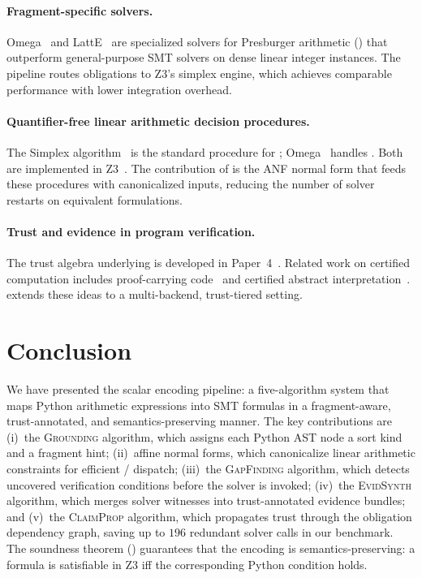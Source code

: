 \documentclass[11pt]{article}
\newcommand{\GroundAlg}{\textsc{Grounding}}  %
\newcommand{\GapAlg}{\textsc{GapFinding}}    %
\newcommand{\EvidAlg}{\textsc{EvidSynth}}    %
\newcommand{\PropAlg}{\textsc{ClaimProp}}    %
\begin{document}
\paragraph{Fragment-specific solvers.}
Omega~\cite{pugh91} and LattE~\cite{latte} are specialized
solvers for Presburger arithmetic (\QFLIA{}) that outperform
general-purpose SMT solvers on dense linear integer instances.
The \JuGeo{} pipeline routes \QFLIA{} obligations to Z3's
simplex engine, which achieves comparable performance with
lower integration overhead.

\paragraph{Quantifier-free linear arithmetic decision procedures.}
The Simplex algorithm~\cite{schrijver} is the standard
procedure for \QFLRA{}; Omega~\cite{pugh91} handles \QFLIA{}.
Both are implemented in Z3~\cite{z3}.
The contribution of  is the ANF normal form
that feeds these procedures with canonicalized inputs,
reducing the number of solver restarts on equivalent formulations.

\paragraph{Trust and evidence in program verification.}
The trust algebra underlying \JuGeo{} is developed in
Paper~4~\cite{paper04}.
Related work on certified computation includes
proof-carrying code~\cite{necula97} and certified abstract
interpretation~\cite{pichardie07}.
\JuGeo{} extends these ideas to a multi-backend, trust-tiered
setting.

\section{Conclusion}\label{sec:conclusion}

We have presented the \JuGeo{} scalar encoding pipeline: a
five-algorithm system that maps Python arithmetic expressions
into SMT formulas in a fragment-aware, trust-annotated, and
semantics-preserving manner.
The key contributions are
(i)~the \GroundAlg{} algorithm, which assigns each Python AST node
a sort kind and a fragment hint;
(ii)~affine normal forms, which canonicalize linear arithmetic
constraints for efficient \QFLIA{}/\QFLRA{} dispatch;
(iii)~the \GapAlg{} algorithm, which detects uncovered
verification conditions before the solver is invoked;
(iv)~the \EvidAlg{} algorithm, which merges solver witnesses
into trust-annotated evidence bundles; and
(v)~the \PropAlg{} algorithm, which propagates trust through
the obligation dependency graph, saving up to $196$ redundant
solver calls in our benchmark.
The soundness theorem () guarantees that
the encoding is semantics-preserving: a formula is satisfiable
in Z3 iff the corresponding Python condition holds.
\end{document}
